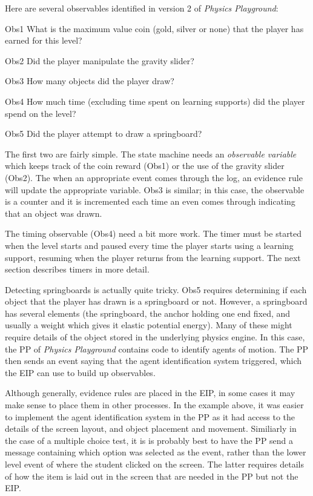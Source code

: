\documentclass{article}
\begin{document}
  Here are several observables identified in version 2 of
  \textit{Physics Playground}:
  \begin{describe}
    \item[Obs1]{What is the maximum value coin (gold, silver or none)
      that the player has earned for this level?}
    \item[Obs2]{Did the player manipulate the gravity slider?}
    \item[Obs3]{How many objects did the player draw?}
    \item[Obs4]{How much time (excluding time spent on learning
      supports) did the player spend on the level?}
    \item[Obs5]{Did the player attempt to draw a springboard?}
  \end{describe}

  The first two are fairly simple.  The state machine needs an
  \textit{observable variable} which keeps track of the coin reward
  (Obs1) or the use of the gravity slider (Obs2).  The when an
  appropriate event comes through the log, an evidence rule will
  update the appropriate variable.  Obs3 is similar; in this case, the
  observable is a counter and it is incremented each time an even
  comes through indicating that an object was drawn.

  The timing observable (Obs4) need a bit more work.  The timer must
  be started when the level starts and paused every time the player
  starts using a learning support, resuming when the player returns
  from the learning support.  The next section describes timers in
  more detail.
  
  Detecting springboards is actually quite tricky.  Obs5 requires
  determining if each object that the player has drawn is a
  springboard or not.  However, a springboard has several elements
  (the springboard, the anchor holding one end fixed, and usually a
  weight which gives it elastic potential energy).  Many of these
  might require details of the object stored in the underlying physics
  engine.  In this case, the PP of \textit{Physics Playground}
  contains code to identify agents of motion.  The PP then sends an
  event saying that the agent identification system triggered, which
  the EIP can use to build up observables.

  Although generally, evidence rules are placed in the EIP, in some
  cases it may make sense to place them in other processes.  In the
  example above, it was easier to implement the agent identification
  system in the PP as it had access to the details of the screen
  layout, and object placement and movement.  Similiarly in the case
  of a multiple choice test, it is is probably best to have the PP
  send a message containing which option was selected as the event,
  rather than the lower level event of where the student clicked on
  the screen.  The latter requires details of how the item is laid
  out in the screen that are needed in the PP but not the EIP.
\end{document}
